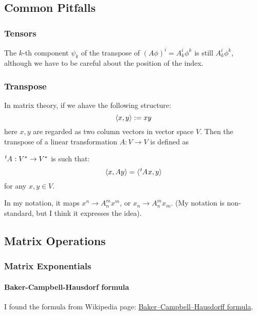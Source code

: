 \subsection{Common Pitfalls}
\label{sec:Common Pitfalls}
    \subsubsection{Tensors}
    \label{sec:Tensors}
    
    The $k$-th component $\psi_k$ of the transpose of $(A\phi)^i = A^i_k
    \phi^k$ is still $A^i_k \phi^k$, although we have to be careful about
    the position of the index.

    \subsubsection{Transpose}
    \label{sec:Transpose}
    
    In matrix theory, if we ahave the following structure:
    $$\braket{x,y} := x y$$
    here $x,y$ are regarded as two column vectors in vector space $V$.
    Then the transpose of a linear transformation $A:V\to V$ is defined
    as
    \begin{defi}[Transpose]
        $\tensor[^t]{A}{}:V^* \to V^*$ is such that:
        \begin{equation}
            \braket{x,Ay} = \braket{\tensor[^t]{A}{}x,y}
        \end{equation}
        for any $x,y\in V$.
    \end{defi}

    In my notation, it maps $x^n\to A^m_n x^m$, or $x_n\to A^m_n x_m$.
    (My notation is non-standard, but I think it expresses the idea).


\subsection{Matrix Operations}
    \subsubsection{Matrix Exponentials}
    \label{sec:Matrix-Exponentials}

    \paragraph{Baker-Campbell-Hausdorf formula}
    I found the formula from Wikipedia page:
    \href{https://en.wikipedia.org/wiki/Baker%E2%80%93Campbell%E2%80%93Hausdorff_formula}{Baker–Campbell–Hausdorff formula}.

